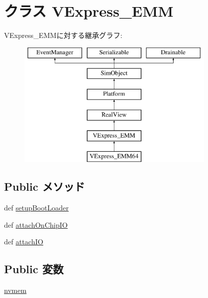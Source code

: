 \hypertarget{classRealView_1_1VExpress__EMM}{
\section{クラス VExpress\_\-EMM}
\label{classRealView_1_1VExpress__EMM}
}
VExpress\_\-EMMに対する継承グラフ:\begin{figure}[H]
\begin{center}
\leavevmode
\includegraphics[height=6cm]{classRealView_1_1VExpress__EMM}
\end{center}
\end{figure}
\subsection*{Public メソッド}
\begin{DoxyCompactItemize}
\item 
def \hyperlink{classRealView_1_1VExpress__EMM_a2bb8c2dabea2e4801ca416188787ef11}{setupBootLoader}
\item 
def \hyperlink{classRealView_1_1VExpress__EMM_abd74cec934f25d2881d5fdd0d5e7f512}{attachOnChipIO}
\item 
def \hyperlink{classRealView_1_1VExpress__EMM_ac750675f6d6de3ad52f8c5b03ee45a65}{attachIO}
\end{DoxyCompactItemize}
\subsection*{Public 変数}
\begin{DoxyCompactItemize}
\item 
\hyperlink{classRealView_1_1VExpress__EMM_abcf52781f9ca2926e1f879ceecb4865c}{nvmem}
\end{DoxyCompactItemize}
